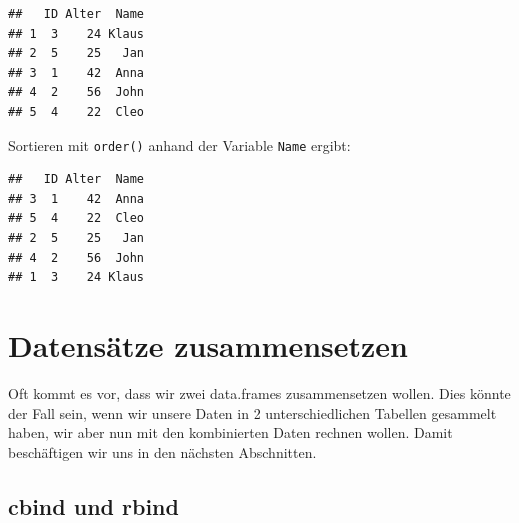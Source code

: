 \documentclass[
]{book}
\newenvironment{Shaded}{\begin{snugshade}}{\end{snugshade}}
\newcommand{\FunctionTok}[1]{\textcolor[rgb]{0.00,0.00,0.00}{#1}}
\newcommand{\NormalTok}[1]{#1}
\newcommand{\OtherTok}[1]{\textcolor[rgb]{0.56,0.35,0.01}{#1}}
\newcommand{\SpecialCharTok}[1]{\textcolor[rgb]{0.00,0.00,0.00}{#1}}
\newcommand{\StringTok}[1]{\textcolor[rgb]{0.31,0.60,0.02}{#1}}
\begin{document}
\begin{Shaded}
\end{Shaded}

\begin{verbatim}
##   ID Alter  Name
## 1  3    24 Klaus
## 2  5    25   Jan
## 3  1    42  Anna
## 4  2    56  John
## 5  4    22  Cleo
\end{verbatim}

Sortieren mit \texttt{order()} anhand der Variable \texttt{Name} ergibt:

\begin{Shaded}
\end{Shaded}

\begin{verbatim}
##   ID Alter  Name
## 3  1    42  Anna
## 5  4    22  Cleo
## 2  5    25   Jan
## 4  2    56  John
## 1  3    24 Klaus
\end{verbatim}

\hypertarget{datensuxe4tze-zusammensetzen}{%
\section{Datensätze zusammensetzen}\label{datensuxe4tze-zusammensetzen}}

Oft kommt es vor, dass wir zwei data.frames zusammensetzen wollen. Dies könnte der Fall sein, wenn wir unsere Daten in 2 unterschiedlichen Tabellen gesammelt haben, wir aber nun mit den kombinierten Daten rechnen wollen. Damit beschäftigen wir uns in den nächsten Abschnitten.

\hypertarget{cbind-und-rbind}{%
\subsection{cbind und rbind}\label{cbind-und-rbind}}
\end{document}
